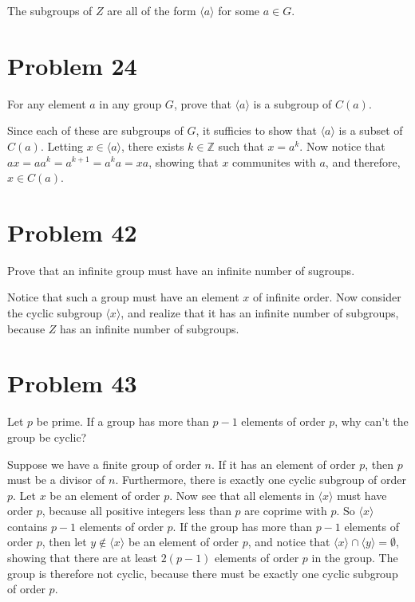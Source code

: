 \documentclass[12pt]{article}
\newcommand{\Z}{\mathbb{Z}}
\begin{document}
The subgroups of $Z$ are all of the form $\langle a\rangle$ for some $a\in G$.

\section*{Problem 24}

For any element $a$ in any group $G$, prove that $\langle a\rangle$ is a subgroup of $C(a)$.

Since each of these are subgroups of $G$, it sufficies to show that $\langle a\rangle$ is a subset
of $C(a)$.  Letting $x\in\langle a\rangle$, there exists $k\in\Z$ such that $x=a^k$.
Now notice that $ax=aa^k=a^{k+1}=a^ka=xa$, showing that $x$ communites with $a$,
and therefore, $x\in C(a)$.

\section*{Problem 42}

Prove that an infinite group must have an infinite number of sugroups.

Notice that such a group must have an element $x$ of infinite order.
Now consider the cyclic subgroup $\langle x\rangle$, and realize that
it has an infinite number of subgroups, because $Z$ has an infinite
number of subgroups.

\section*{Problem 43}

Let $p$ be prime.  If a group has more than $p-1$ elements of order $p$,
why can't the group be cyclic?

Suppose we have a finite group of order $n$.  If it has an element of order $p$,
then $p$ must be a divisor of $n$.  Furthermore, there is exactly one cyclic
subgroup of order $p$.  Let $x$ be an element of order $p$.  Now see that all elements in $\langle x\rangle$ must
have order $p$, because all positive integers less than $p$ are coprime with $p$.
So $\langle x\rangle$ contains $p-1$ elements of order $p$.  If the group
has more than $p-1$ elements of order $p$, then let $y\not\in\langle x\rangle$
be an element of order $p$, and notice that $\langle x\rangle\cap\langle y\rangle=\emptyset$,
showing that there are at least $2(p-1)$ elements of order $p$ in the group.
The group is therefore not cyclic, because there must be exactly one cyclic subgroup
of order $p$.
\end{document}
